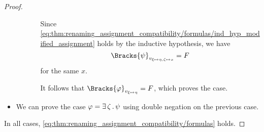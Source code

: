\begin{proof}
\begin{itemize}
\begin{itemize}
\begin{itemize}
        Since \eqref{eq:thm:renaming_assignment_compatibility/formulas/ind_hyp_modified_assignment} holds by the inductive hypothesis, we have
        \begin{equation*}
          \Bracks{\psi}_{v_{\xi \mapsto \eta, \zeta \mapsto x}} = F
        \end{equation*}
        for the same \( x \).

        It follows that \( \Bracks{\varphi}_{v_{\xi \mapsto \eta}} = F \), which proves the case.
      \end{itemize}
    \end{itemize}

    \item We can prove the case \( \varphi = \exists \thinspace \zeta \thinspace . \thinspace \psi \) using double negation on the previous case.
  \end{itemize}

  In all cases, \eqref{eq:thm:renaming_assignment_compatibility/formulas} holds.
\end{proof}

